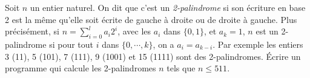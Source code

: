 \exer{}
\setcounter{numques}{0}

Soit $n$ un entier naturel. On dit que c'est un \emph{2-palindrome} si son
écriture en base 2 est la même qu'elle soit écrite de gauche à droite ou de
droite à gauche. Plus précisément, si $n=\displaystyle\sum_{i=0}^l a_i2^i$,
avec les $a_i$ dans $\{0,1\}$, et $a_k=1$, $n$ est un 2-palindrome si pour tout
$i$ dans $\{0,\cdots,k\}$, on a $a_i=a_{k-i}$. Par exemple les entiers 3
(11), 5 (101), 7 (111), 9 (1001) et 15 (1111) sont des 2-palindromes. Écrire un
programme qui calcule les 2-palindromes $n$ tels que $n\leq 511$.